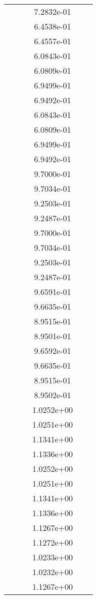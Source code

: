 \begin{xltabular}{\textwidth}{r|rS[table-format=1.3e+2]S[table-format=1.4e+2]S[table-format=1.4e+2]S[table-format=-1.5]}
&  &  & 7.2832e-01 & & \\
&  &  & 6.4538e-01 & & \\
&  &  & 6.4557e-01 & & \\
&  &  & 6.0843e-01 & & \\
&  &  & 6.0809e-01 & & \\
&  &  & 6.9499e-01 & & \\
&  &  & 6.9492e-01 & & \\
&  &  & 6.0843e-01 & & \\
&  &  & 6.0809e-01 & & \\
&  &  & 6.9499e-01 & & \\
&  &  & 6.9492e-01 & & \\
&  &  & 9.7000e-01 & & \\
&  &  & 9.7034e-01 & & \\
&  &  & 9.2503e-01 & & \\
&  &  & 9.2487e-01 & & \\
&  &  & 9.7000e-01 & & \\
&  &  & 9.7034e-01 & & \\
&  &  & 9.2503e-01 & & \\
&  &  & 9.2487e-01 & & \\
&  &  & 9.6591e-01 & & \\
&  &  & 9.6635e-01 & & \\
&  &  & 8.9515e-01 & & \\
&  &  & 8.9501e-01 & & \\
&  &  & 9.6592e-01 & & \\
&  &  & 9.6635e-01 & & \\
&  &  & 8.9515e-01 & & \\
&  &  & 8.9502e-01 & & \\
&  &  & 1.0252e+00 & & \\
&  &  & 1.0251e+00 & & \\
&  &  & 1.1341e+00 & & \\
&  &  & 1.1336e+00 & & \\
&  &  & 1.0252e+00 & & \\
&  &  & 1.0251e+00 & & \\
&  &  & 1.1341e+00 & & \\
&  &  & 1.1336e+00 & & \\
&  &  & 1.1267e+00 & & \\
&  &  & 1.1272e+00 & & \\
&  &  & 1.0233e+00 & & \\
&  &  & 1.0232e+00 & & \\
&  &  & 1.1267e+00 & & \\

\end{xltabular}
